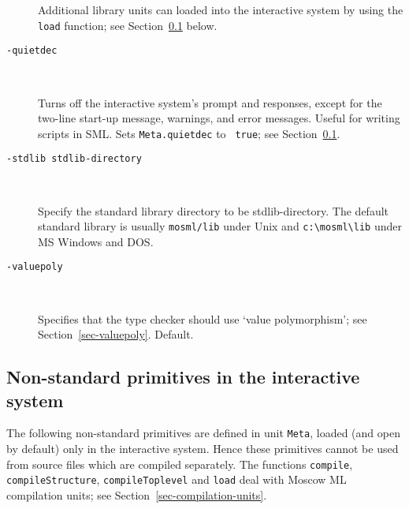 \documentclass[fleqn]{article}
\begin{document}
\begin{description}
  Additional library units can loaded into the interactive system by
  using the {\tt load} function; see
  Section~\ref{sec-nonstandard-interactive} below.

\item[{\tt -quietdec}]\mbox{ }

  Turns off the interactive system's prompt and responses, except for
  the two-line start-up message, warnings, and error messages.  Useful
  for writing scripts in SML\@.  Sets {\tt Meta.quietdec} to {\tt
    true}; see Section~\ref{sec-nonstandard-interactive}.
  
\item[{\tt -stdlib {\rm stdlib-directory}}]\mbox{ }

  Specify the standard library directory to be stdlib-directory.  The
  default standard library is usually {\tt mosml/lib} under Unix and
  \verb#c:\mosml\lib# under MS Windows and DOS.

\item[{\tt -valuepoly}]\mbox{ }

  Specifies that the type checker should use `value polymorphism'; see
  Section~\ref{sec-valuepoly}.  Default.
\end{description}


\subsection{Non-standard primitives in the interactive system}
\label{sec-nonstandard-interactive}

The following non-standard primitives are defined in unit {\tt Meta},
loaded (and open by default) only in the interactive system.  Hence
these primitives cannot be used from source files which are compiled
separately.  The functions {\tt compile}, \texttt{compileStructure},
\texttt{compileToplevel} and {\tt load} deal with Moscow ML
compilation units; see Section~\ref{sec-compilation-units}.
\end{document}
